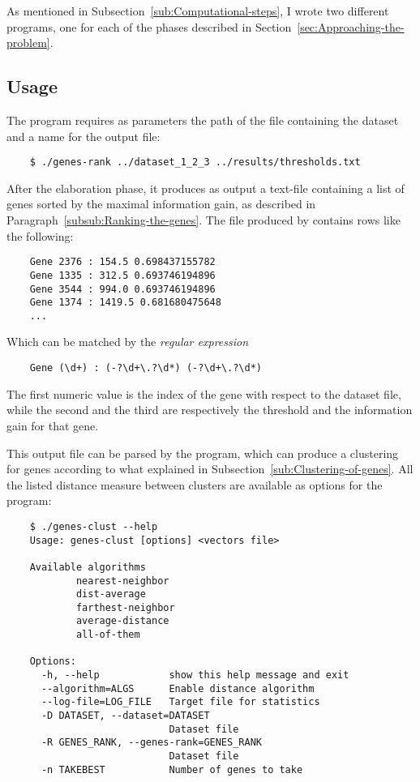 As mentioned in Subsection~\ref{sub:Computational-steps}, I wrote two
different programs, one for each of the phases described in
Section~\ref{sec:Approaching-the-problem}.

\subsection{ Usage }

    The program  requires as parameters the path
    of the file containing the dataset and a name for the output file:
    \begin{verbatim}
    $ ./genes-rank ../dataset_1_2_3 ../results/thresholds.txt
    \end{verbatim}

    After the elaboration phase, it produces as output a text-file
    containing a list of genes sorted by the maximal information gain, as
    described in Paragraph~\ref{subsub:Ranking-the-genes}. The file
    produced by  contains rows like the following:
    \begin{verbatim}
    Gene 2376 : 154.5 0.698437155782
    Gene 1335 : 312.5 0.693746194896
    Gene 3544 : 994.0 0.693746194896
    Gene 1374 : 1419.5 0.681680475648
    ...
    \end{verbatim}

    Which can be matched by the \emph{regular expression}
    \begin{verbatim}
    Gene (\d+) : (-?\d+\.?\d*) (-?\d+\.?\d*)
    \end{verbatim}

    The first numeric value is the index of the gene with respect to the
    dataset file, while the second and the third are respectively the
    threshold and the information gain for that gene.

    This output file can be parsed by the  program,
    which can produce a clustering for genes according to what explained
    in Subsection~\ref{sub:Clustering-of-genes}. All the listed distance
    measure between clusters are available as options for the program:
    \begin{verbatim}
    $ ./genes-clust --help
    Usage: genes-clust [options] <vectors file>

    Available algorithms
            nearest-neighbor
            dist-average
            farthest-neighbor
            average-distance
            all-of-them

    Options:
      -h, --help            show this help message and exit
      --algorithm=ALGS      Enable distance algorithm
      --log-file=LOG_FILE   Target file for statistics
      -D DATASET, --dataset=DATASET
                            Dataset file
      -R GENES_RANK, --genes-rank=GENES_RANK
                            Dataset file
      -n TAKEBEST           Number of genes to take
    \end{verbatim}

